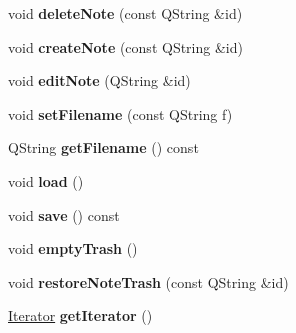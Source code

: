 \begin{DoxyCompactItemize}
void {\bfseries delete\+Note} (const Q\+String \&id)
\item 
\mbox{\label{class_notes_manager_a5a47d17ce4add155db4715f027a7ea4f}} 
void {\bfseries create\+Note} (const Q\+String \&id)
\item 
\mbox{\label{class_notes_manager_a7a08ec1cfdd1b619141887166becbe8d}} 
void {\bfseries edit\+Note} (Q\+String \&id)
\item 
\mbox{\label{class_notes_manager_a797d858176de3f5e64aa8194797909fb}} 
void {\bfseries set\+Filename} (const Q\+String f)
\item 
\mbox{\label{class_notes_manager_a566cbb0dd7b606ec34629a2aa8010b73}} 
Q\+String {\bfseries get\+Filename} () const
\item 
\mbox{\label{class_notes_manager_ad4fb2de50633dd25b71024343341cd64}} 
void {\bfseries load} ()
\item 
\mbox{\label{class_notes_manager_ad271bd7f8079b01b04a32b886b498bac}} 
void {\bfseries save} () const
\item 
\mbox{\label{class_notes_manager_a84e962ad7fa999cbb687fb43c1b3bab4}} 
void {\bfseries empty\+Trash} ()
\item 
\mbox{\label{class_notes_manager_abc6587a5d3986ae674e5dd4b9044f348}} 
void {\bfseries restore\+Note\+Trash} (const Q\+String \&id)
\item 
\mbox{\label{class_notes_manager_a4907351a20cc85b1fe0327ac1b15c7da}} 
\hyperlink{class_notes_manager_1_1_iterator}{Iterator} {\bfseries get\+Iterator} ()
\end{DoxyCompactItemize}
